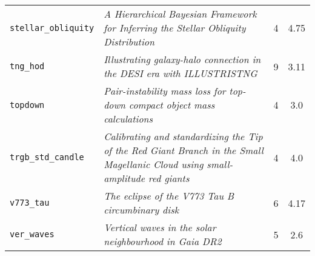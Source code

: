 \begin{table}[htbp]
\begin{tabular}{lp{7.5cm}cc}
\small\texttt{stellar\_obliquity} & \small\textit{A Hierarchical Bayesian Framework for Inferring the Stellar Obliquity Distribution} \citep{stellar_obliquity} & 4 & 4.75 \\
\small\texttt{tng\_hod} & \small\textit{Illustrating galaxy-halo connection in the DESI era with ILLUSTRISTNG} \citep{tng_hod} & 9 & 3.11 \\
\small\texttt{topdown} & \small\textit{Pair-instability mass loss for top-down compact object mass calculations} \citep{topdown} & 4 & 3.0 \\
\small\texttt{trgb\_std\_candle} & \small\textit{Calibrating and standardizing the Tip of the Red Giant Branch in the Small Magellanic Cloud using small-amplitude red giants} \citep{trgb_std_candle} & 4 & 4.0 \\
\small\texttt{v773\_tau} & \small\textit{The eclipse of the V773 Tau B circumbinary disk} \citep{v773_tau} & 6 & 4.17 \\
\small\texttt{ver\_waves} & \small\textit{Vertical waves in the solar neighbourhood in Gaia DR2} \citep{ver_waves} & 5 & 2.6 \\
\bottomrule
\end{tabular}
\end{table}